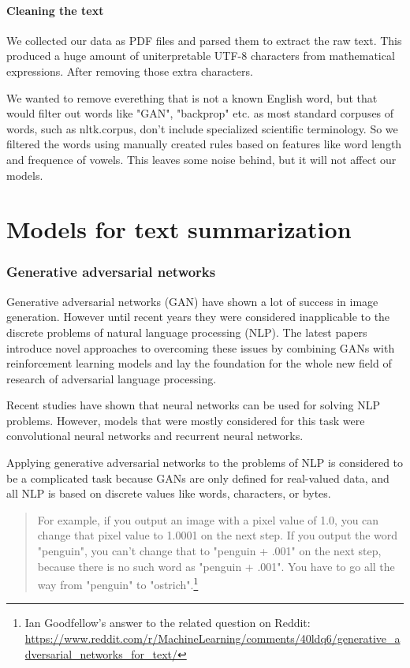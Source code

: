 \documentclass[sigplan]{acmart}
\begin{document}
\paragraph{Cleaning the text} We collected our data as PDF files and parsed them to extract the raw text. This produced a huge amount of uniterpretable UTF-8 characters from mathematical expressions. After removing those extra characters.

We wanted to remove everething that is not a known English word, but that would filter out words like "GAN", "backprop" etc. as most standard corpuses of words, such as nltk.corpus, don't include specialized scientific terminology. So we filtered the words using manually created rules based on features like word length and frequence of vowels. This leaves some noise behind, but it will not affect our models.

\section{Models for text summarization}

\subsubsection{Generative adversarial networks}
Generative adversarial networks (GAN) have shown a lot of success in image generation. However until recent years they were considered inapplicable to the discrete problems of natural language processing (NLP). The latest papers introduce novel approaches to overcoming these issues by combining GANs with reinforcement learning models and lay the foundation for the whole new field of research of adversarial language processing.

Recent studies have shown that neural networks can be used for solving NLP problems. However, models that were mostly considered for this task were convolutional neural networks and recurrent neural networks.

Applying generative adversarial networks to the problems of NLP is considered to be a complicated task because GANs are only defined for real-valued data, and all NLP is based on discrete values like words, characters, or bytes.

\begin{quote}
For example, if you output an image with a pixel value of 1.0, you can change that pixel value to 1.0001 on the next step. If you output the word "penguin", you can't change that to "penguin + .001" on the next step, because there is no such word as "penguin + .001". You have to go all the way from "penguin" to "ostrich".\footnote{Ian Goodfellow's answer to the related question on Reddit: \url{https://www.reddit.com/r/MachineLearning/comments/40ldq6/generative_adversarial_networks_for_text/}}
\end{quote}
\end{document}

